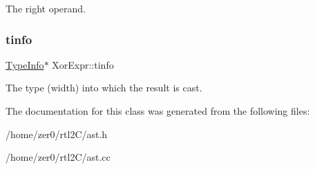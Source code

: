 The right operand. \mbox{\label{class_xor_expr_a87b05f2fd9fa26e3c87f96f635240631}} 
\subsubsection{\texorpdfstring{tinfo}{tinfo}}
{\footnotesize\ttfamily \hyperlink{class_type_info}{Type\+Info}$\ast$ Xor\+Expr\+::tinfo\hspace{0.3cm}{\ttfamily [protected]}}

The type (width) into which the result is cast. 

The documentation for this class was generated from the following files\+:\begin{DoxyCompactItemize}
\item 
/home/zer0/rtl2\+C/ast.\+h\item 
/home/zer0/rtl2\+C/ast.\+cc\end{DoxyCompactItemize}
